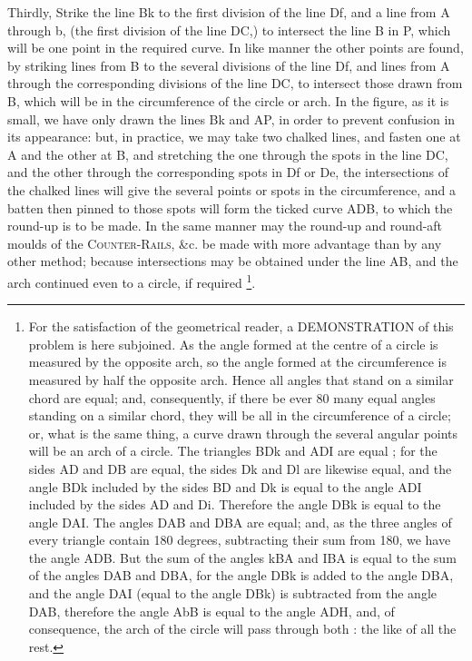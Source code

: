 Thirdly, Strike the line Bk to the first division of the line Df, and a line from A through b, (the first division of the line DC,) to intersect the line B in P, which will be one point in the required curve. In like manner the other points are found, by striking lines from B to the several divisions of the line Df, and lines from A through the corresponding divisions of the line DC, to intersect those drawn from B, which will be in the circumference of the circle or arch. In the figure, as it is small, we have only drawn the lines Bk and AP, in order to prevent confusion in its appearance: but, in practice, we may take two chalked lines, and fasten one at A and the other at B, and stretching the one through the spots in the line DC, and the other through the corresponding spots in Df or De, the intersections of the chalked lines will give the several points or spots in the circumference, and a batten then pinned to those spots will form the ticked curve ADB, to which the round-up is to be made. In the same manner may the round-up and round-aft moulds of the \textsc{Counter-Rails}, \&c. be made with more advantage than by any other method; because intersections may be obtained under the line AB, and the arch continued even to a circle, if required \footnote{For the satisfaction of the geometrical reader, a DEMONSTRATION of this problem is here subjoined. As the angle formed at the centre of a circle is measured by the opposite arch, so the angle formed at the circumference is measured by half the opposite arch. Hence all angles that stand on a similar chord are equal; and, consequently, if there be ever 80 many equal angles standing on a similar chord, they will be all in the circumference of a circle; or, what is the same thing, a curve drawn through the several angular points will be an arch of a circle. The triangles BDk and ADI are equal ; for the sides AD and DB are equal, the sides Dk and Dl are likewise equal, and the angle BDk included by the sides BD and Dk is equal to the angle ADI included by the sides AD and Di. Therefore the angle DBk is equal to the angle DAI. The angles DAB and DBA are equal; and, as the three angles of every triangle contain 180 degrees, subtracting their sum from 180, we have the angle ADB. But the sum of the angles kBA and IBA is equal to the sum of the angles DAB and DBA, for the angle DBk is added to the angle DBA, and the angle DAI (equal to the angle DBk) is subtracted from the angle DAB, therefore the angle AbB is equal to the angle ADH, and, of consequence, the arch of the circle will pass through both : the like of all the rest.}. 

